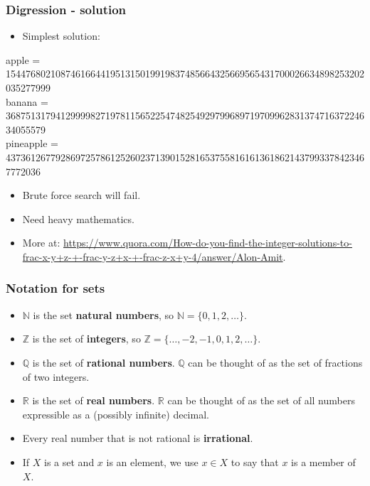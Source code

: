 \documentclass[handout]{beamer}
\newcommand{\bN}{\mathbb{N}}
\newcommand{\bZ}{\mathbb{Z}}
\newcommand{\bQ}{\mathbb{Q}}
\newcommand{\bR}{\mathbb{R}}
\begin{document}
\begin{frame}
\frametitle{Digression - solution}
\begin{itemize}
\item Simplest solution:
\end{itemize}
\vspace{0.3cm}
\tiny
apple = 154476802108746166441951315019919837485664325669565431700026634898253202035277999\\
banana = 36875131794129999827197811565225474825492979968971970996283137471637224634055579\\
pineapple = 4373612677928697257861252602371390152816537558161613618621437993378423467772036\\
\normalsize
\vspace{0.3cm}
\begin{itemize}
\item Brute force search will fail.
\item Need heavy mathematics. 
\item More at: \url{https://www.quora.com/How-do-you-find-the-integer-solutions-to-frac-x-y+z-+-frac-y-z+x-+-frac-z-x+y-4/answer/Alon-Amit}.
\end{itemize}
\end{frame}

\begin{frame}
\frametitle{Notation for sets}
\begin{itemize}
\item $\bN$ is the set \textbf{natural numbers}, so $\bN=\{0,1,2,\ldots\}$.
\vspace{0.3cm}
\item $\bZ$ is the set of \textbf{integers}, so $\bZ=\{\ldots,-2,-1,0,1,2,\ldots\}$.
\vspace{0.3cm}
\item $\bQ$ is the set of \textbf{rational numbers}. $\bQ$ can be thought of as the set of fractions of two integers.
\vspace{0.3cm}
\item $\bR$ is the set of \textbf{real numbers}. $\bR$ can be thought of as the set of all numbers expressible as a (possibly infinite) decimal. 
\vspace{0.3cm}
\item Every real number that is not rational is \textbf{irrational}.
\vspace{0.3cm}
\item If $X$ is a set and $x$ is an element, we use $x\in X$ to say that $x$ is a member of $X$.

\end{itemize}
\end{frame}
\end{document}
